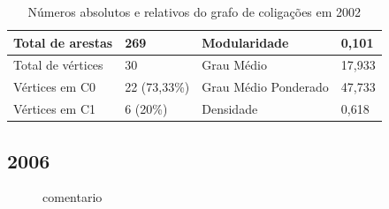 \begin{table}[H]
\centering
\label{table-2002}
\begin{tabular}{|l|l|l|l|}
\hline
Total de arestas  & 269 & Modularidade         & 0,101 \\ \hline
Total de vértices & 30  & Grau Médio           & 17,933 \\ \hline
Vértices em C0    & 22  (73,33\%) & Grau Médio Ponderado & 47,733 \\ \hline
Vértices em C1    & 6 (20\%) & Densidade            &  0,618\\ \hline
\end{tabular}
\caption{Números absolutos e relativos do grafo de coligações em 2002}
\end{table}

\subsection{2006}
\label{resultados__grafos--2006}

\begin{figure}[H]
\center
    \qquad

    \caption{comentario}
\end{figure}

